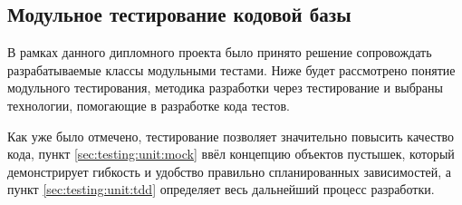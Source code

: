 \subsection{Модульное тестирование кодовой базы}
\label{sec:testing:unit}

В рамках данного дипломного проекта было принято решение сопровождать разрабатываемые классы модульными тестами. Ниже будет рассмотрено понятие модульного тестирования, методика разработки через тестирование и выбраны технологии, помогающие в разработке кода тестов.





Как уже было отмечено, тестирование позволяет значительно повысить качество кода, пункт \ref{sec:testing:unit:mock} ввёл концепцию объектов пустышек, который демонстрирует гибкость и удобство правильно спланированных зависимостей, а пункт \ref{sec:testing:unit:tdd} определяет весь дальнейший процесс разработки.